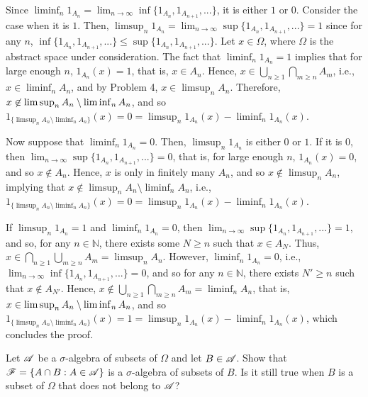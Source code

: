 \begin{solution}
    Since $\liminf_{n} 1_{A_n} = \lim_{n \to \infty} \inf \{ 1_{A_n}, 1_{A_{n + 1}}, ... \}$, it is either $1$ or $0$. Consider the case when it is $1$. Then, $\limsup_n 1_{A_n} = \lim_{n \to \infty} \sup \{ 1_{A_n}, 1_{A_{n + 1}}, ... \} = 1$ since for any $n$, $\inf \{ 1_{A_n}, 1_{A_{n + 1}}, ... \} \leq \sup \{ 1_{A_n}, 1_{A_{n + 1}}, ... \}$. Let $x \in \Omega$, where $\Omega$ is the abstract space under consideration. The fact that $\liminf_{n} 1_{A_n} = 1$ implies that for large enough $n$, $1_{A_n}(x) = 1$, that is, $x \in A_n$. Hence, $x \in \bigcup_{n \geq 1} \bigcap_{m \geq n} A_m$, i.e., $x \in \liminf_n A_n$, and by Problem 4, $x \in \limsup_n A_n$. Therefore, $x \not\in \limsup_n A_n \setminus \liminf_n A_n$,  and so $1_{\{\limsup_n A_n \setminus \liminf_n A_n\}}(x) = 0 = \limsup_n 1_{A_n}(x) - \liminf_n 1_{A_n}(x)$.

    Now suppose that $\liminf_n 1_{A_n} = 0 $. Then, $\limsup_n 1_{A_n}$ is either $0$ or $1$. If it is $0$, then $\lim_{n \to \infty} \sup \{ 1_{A_n}, 1_{A_{n + 1}},... \} = 0$, that is, for large enough $n$, $1_{A_n}(x) = 0$, and so $x \not\in A_n$. Hence, $x$ is only in finitely many $A_n$, and so $x \not\in \limsup_n A_n$, implying that $x \not\in \limsup_n A_n \setminus \liminf_n A_n$, i.e., $1_{\{\limsup_n A_n \setminus \liminf_n A_n\}}(x) = 0 = \limsup_{n} 1_{A_n}(x) -  \liminf_{n} 1_{A_n}(x)$.

    If $\limsup_n 1_{A_n} = 1$ and $\liminf_n 1_{A_n} = 0$, then $\lim_{n \to \infty} \sup\{1_{A_n}, 1_{A_{n + 1}}, ... \} = 1$, and so, for any $n \in \mathbb{N}$, there exists some $N \geq n$ such that $x \in A_N$. Thus, $x \in \bigcap_{n \geq 1} \bigcup_{m \geq n} A_m = \limsup_n A_n$. However, $\liminf_n 1_{A_n} = 0$, i.e., $\lim_{n \to \infty} \inf \{1_{A_n}, 1_{A_{n + 1}},...\} = 0$, and so for any $n \in \mathbb{N}$, there exists $N' \geq n$ such that $x \not\in A_{N'}$. Hence, $x \not \in \bigcup_{n \geq 1} \bigcap_{m \geq n} A_m = \liminf_n A_n$, that is, $x \in \limsup_nA_n \setminus \liminf_n A_n$, and so $1_{\{\limsup_n A_n \setminus \liminf_n A_n\}}(x) = 1 = \limsup_n1_{A_n}(x) - \liminf_n1_{A_n}(x)$, which concludes the proof.
\end{solution}


\begin{problem}
    Let $\mathscr{A}$ be a $\sigma$-algebra of subsets of $\Omega$ and let $B \in \mathscr{A}$. Show that $\mathscr{F} = \{ A \cap B : A \in \mathscr{A}\}$ is a $\sigma$-algebra of subsets of $B$. Is it still true when $B$ is a subset of $\Omega$ that does not belong to $\mathscr{A}$?
\end{problem}

